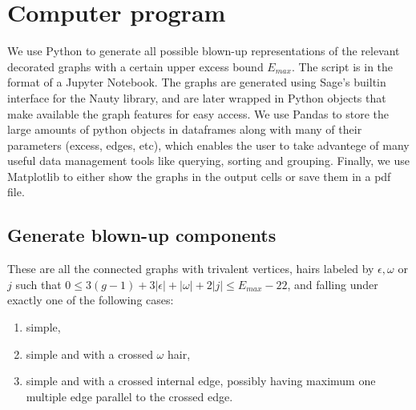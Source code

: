 \section{Computer program}


\newcommand{\myB}{\bGK^{12,1}}

We use Python to generate all possible blown-up representations of the relevant decorated graphs with a certain upper excess bound $E_{max}$. The script is in the format of a Jupyter Notebook. The graphs are generated using Sage's builtin interface for the Nauty library, and are later wrapped in Python objects that make available the graph features for easy access. We use Pandas to store the large amounts of python objects in dataframes along with many of their parameters (excess, edges, etc), which enables the user to take advantege of many useful data management tools like querying, sorting and grouping. Finally, we use Matplotlib to either show the graphs in the output cells or save them in a pdf file.

\subsection{Generate blown-up components} These are all the connected graphs with trivalent vertices, hairs labeled by $\epsilon,\omega$ or $j$ such that $0\leq 3(g-1)+3|\epsilon|+|\omega|+2|j| \leq E_{max}-22$, and falling under exactly one of the following cases:
\begin{enumerate}
    \item simple,
    \item simple and with a crossed $\omega$ hair,
    \item simple and with a crossed internal edge, possibly having maximum one multiple edge parallel to the crossed edge.
\end{enumerate}


